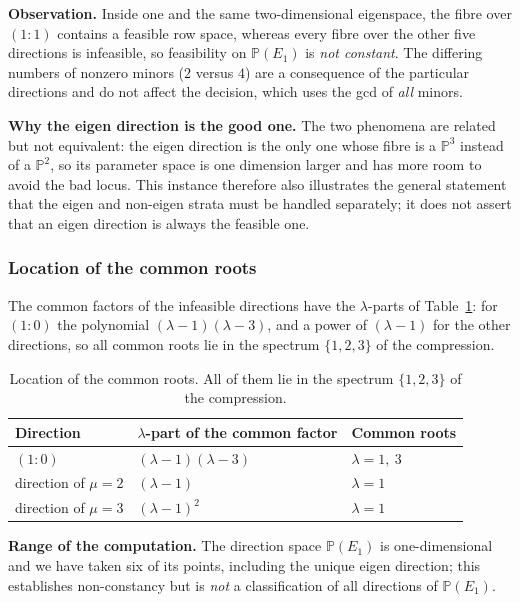 \textbf{Observation.} Inside one and the same two-dimensional eigenspace, the fibre over $(1\!:\!1)$
contains a feasible row space, whereas every fibre over the other five directions is infeasible, so
feasibility on $\mathbb{P}(E_1)$ is \emph{not constant}. The differing numbers of nonzero minors ($2$
versus $4$) are a consequence of the particular directions and do not affect the decision, which uses
the gcd of \emph{all} minors.

\textbf{Why the eigen direction is the good one.} The two phenomena are related but not equivalent: the
eigen direction is the only one whose fibre is a $\mathbb{P}^{3}$ instead of a $\mathbb{P}^{2}$, so its
parameter space is one dimension larger and has more room to avoid the bad locus. This instance
therefore also illustrates the general statement that the eigen and non-eigen strata must be handled
separately; it does not assert that an eigen direction is always the feasible one.

\subsubsection{Location of the common roots}\label{sec6:sub:roots}

The common factors of the infeasible directions have the $\lambda$-parts of Table~\ref{sec6:tab:roots}:
for $(1\!:\!0)$ the polynomial $(\lambda-1)(\lambda-3)$, and a power of $(\lambda-1)$ for the other
directions, so all common roots lie in the spectrum $\{1,2,3\}$ of the compression.

\begin{table}[t]
\centering
\caption{Location of the common roots. All of them lie in the spectrum $\{1,2,3\}$ of the compression.}
\label{sec6:tab:roots}
\begin{tabular}{@{}lll@{}}
\toprule
Direction & $\lambda$-part of the common factor & Common roots\\
\midrule
$(1\!:\!0)$ & $(\lambda-1)(\lambda-3)$ & $\lambda=1,\ 3$\\
direction of $\mu=2$ & $(\lambda-1)$ & $\lambda=1$\\
direction of $\mu=3$ & $(\lambda-1)^{2}$ & $\lambda=1$\\
\bottomrule
\end{tabular}
\end{table}

\textbf{Range of the computation.} The direction space $\mathbb{P}(E_1)$ is one-dimensional and we
have taken six of its points, including the unique eigen direction; this establishes non-constancy but
is \emph{not} a classification of all directions of $\mathbb{P}(E_1)$.

